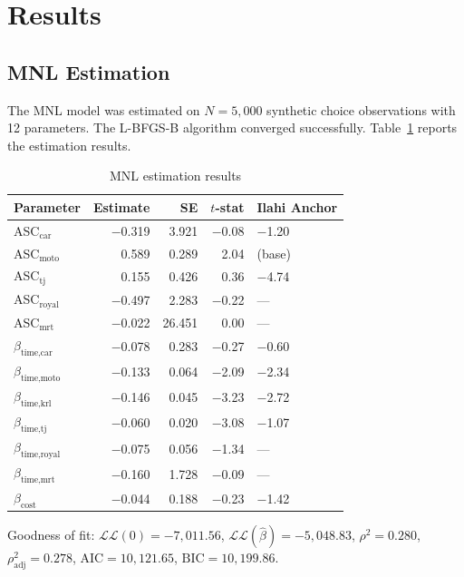 \documentclass[12pt,a4paper]{article}
\begin{document}
\section{Results}

\subsection{MNL Estimation}

The MNL model was estimated on $N = 5{,}000$ synthetic choice observations with 12 parameters. The L-BFGS-B algorithm converged successfully. Table~\ref{tab:mnl} reports the estimation results.

\begin{table}[ht]
\centering
\caption{MNL estimation results}
\label{tab:mnl}
\begin{tabular}{lrrrl}
\toprule
Parameter & Estimate & SE & $t$-stat & Ilahi Anchor \\
\midrule
ASC$_{\text{car}}$       & $-$0.319 & 3.921  & $-$0.08 & $-$1.20 \\
ASC$_{\text{moto}}$      & 0.589  & 0.289  & 2.04  & (base) \\
ASC$_{\text{tj}}$        & 0.155  & 0.426  & 0.36  & $-$4.74 \\
ASC$_{\text{royal}}$     & $-$0.497 & 2.283  & $-$0.22 & --- \\
ASC$_{\text{mrt}}$       & $-$0.022 & 26.451 & 0.00  & --- \\
$\beta_{\text{time,car}}$   & $-$0.078 & 0.283  & $-$0.27 & $-$0.60 \\
$\beta_{\text{time,moto}}$  & $-$0.133 & 0.064  & $-$2.09 & $-$2.34 \\
$\beta_{\text{time,krl}}$   & $-$0.146 & 0.045  & $-$3.23 & $-$2.72 \\
$\beta_{\text{time,tj}}$    & $-$0.060 & 0.020  & $-$3.08 & $-$1.07 \\
$\beta_{\text{time,royal}}$ & $-$0.075 & 0.056  & $-$1.34 & --- \\
$\beta_{\text{time,mrt}}$   & $-$0.160 & 1.728  & $-$0.09 & --- \\
$\beta_{\text{cost}}$       & $-$0.044 & 0.188  & $-$0.23 & $-$1.42 \\
\bottomrule
\end{tabular}
\end{table}

Goodness of fit: $\mathcal{L}\mathcal{L}(0) = -7{,}011.56$, $\mathcal{L}\mathcal{L}(\hat{\beta}) = -5{,}048.83$, $\rho^2 = 0.280$, $\rho^2_{\text{adj}} = 0.278$, $\text{AIC} = 10{,}121.65$, $\text{BIC} = 10{,}199.86$.
\end{document}
